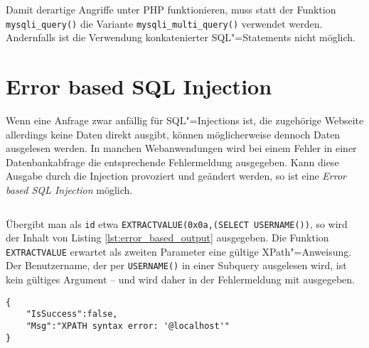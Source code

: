 Damit derartige Angriffe unter PHP funktionieren, muss statt der Funktion \texttt{mysqli_query()} die Variante \texttt{mysqli_multi_query()} verwendet werden. Andernfalls ist die Verwendung konkatenierter SQL"=Statements nicht möglich.


\section{Error based SQL Injection}

Wenn eine Anfrage zwar anfällig für SQL"=Injections ist, die zugehörige Webseite allerdings keine Daten direkt ausgibt, können möglicherweise dennoch Daten ausgelesen werden. In manchen Webanwendungen wird bei einem Fehler in einer Datenbankabfrage die entsprechende Fehlermeldung ausgegeben. Kann diese Ausgabe durch die Injection provoziert und geändert werden, so ist eine \emph{Error based SQL Injection} möglich.


\begin{listing}
\begin{margincap}
\inputminted[startinline,obeytabs]{php}{imports/cp_multi_error.php}
\caption[cp multi view calendar]{Ein Auszug aus dem Wordpress"=Plugin \texttt{cp multi view calendar}\footnote{\url{https://github.com/wp-plugins/cp-multi-view-calendar}}. Die Variable \texttt{id} wird nicht überprüft und ermöglicht so SQL"=Injections. Im Fehlerfall wird die Meldung in Zeile 7 in eine lokale Variable geschrieben und später ausgegeben.}
\label{lst:cp_multi_error}
\end{margincap}
\end{listing}

Übergibt man als \texttt{id} etwa \texttt{EXTRACTVALUE(0x0a,(SELECT USERNAME())}, so wird der Inhalt von Listing \ref{lst:error_based_output} ausgegeben. Die Funktion \texttt{EXTRACTVALUE} erwartet als zweiten Parameter eine gültige XPath"=Anweisung. Der Benutzername, der per \texttt{USERNAME()} in einer Subquery ausgelesen wird, ist kein gültiges Argument -- und wird daher in der Fehlermeldung mit ausgegeben.

\begin{listing}
\begin{margincap}
\begin{verbatim}
{
    "IsSuccess":false,
    "Msg":"XPATH syntax error: '@localhost'"
}
\end{verbatim}
\caption{Ausgabe der \emph{Error based} SQL"=Injection. In der Fehlermeldung ist das Resultat der Subquery zu sehen, in diesem Fall der Rückgabewert der Funktion \texttt{USERNAME().}}
\label{lst:error_based_output}
\end{margincap}
\end{listing}


